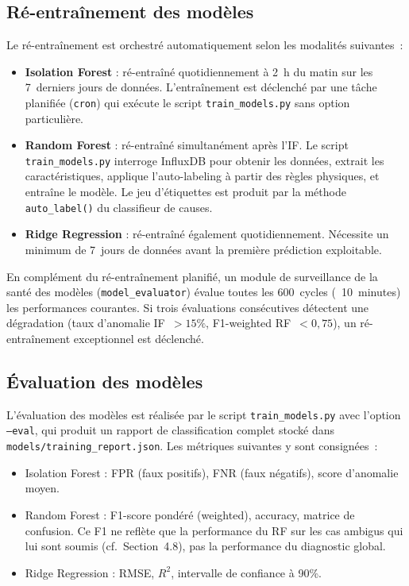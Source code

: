 \subsection{Ré-entraînement des modèles}

Le ré-entraînement est orchestré automatiquement selon les modalités suivantes~:

\begin{itemize}
  \item \textbf{Isolation Forest} : ré-entraîné quotidiennement à 2~h du matin sur les 7~derniers jours de données. L'entraînement est déclenché par une tâche planifiée (\texttt{cron}) qui exécute le script \texttt{train\_models.py} sans option particulière.
  \item \textbf{Random Forest} : ré-entraîné simultanément après l'IF. Le script \texttt{train\_models.py} interroge InfluxDB pour obtenir les données, extrait les caractéristiques, applique l'auto-labeling à partir des règles physiques, et entraîne le modèle. Le jeu d'étiquettes est produit par la méthode \texttt{auto\_label()} du classifieur de causes.
  \item \textbf{Ridge Regression} : ré-entraîné également quotidiennement. Nécessite un minimum de 7~jours de données avant la première prédiction exploitable.
\end{itemize}

En complément du ré-entraînement planifié, un module de surveillance de la santé des modèles (\texttt{model\_evaluator}) évalue toutes les 600~cycles (~10~minutes) les performances courantes. Si trois évaluations consécutives détectent une dégradation (taux d'anomalie IF~\(>15\%\), F1-weighted RF~\(<0,75\)), un ré-entraînement exceptionnel est déclenché.

\subsection{Évaluation des modèles}

L'évaluation des modèles est réalisée par le script \texttt{train\_models.py} avec l'option \texttt{--eval}, qui produit un rapport de classification complet stocké dans \texttt{models/training\_report.json}. Les métriques suivantes y sont consignées~:

\begin{itemize}
  \item Isolation Forest : FPR (faux positifs), FNR (faux négatifs), score d'anomalie moyen.
  \item Random Forest : F1-score pondéré (weighted), accuracy, matrice de confusion. Ce F1 ne reflète que la performance du RF sur les cas ambigus qui lui sont soumis (cf.~Section~4.8), pas la performance du diagnostic global.
  \item Ridge Regression : RMSE, \(R^2\), intervalle de confiance à 90\%.
\end{itemize}

